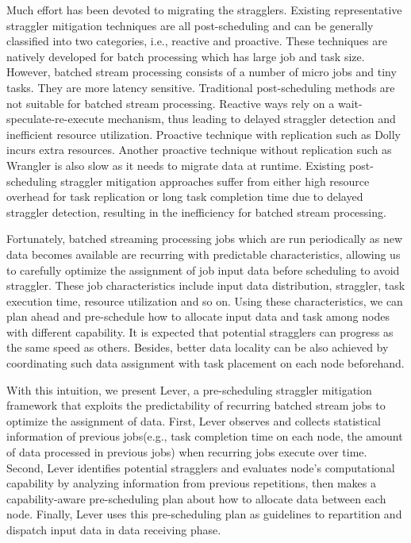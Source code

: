   Much effort has been devoted to migrating the stragglers. Existing representative straggler mitigation techniques are all post-scheduling and can be generally classified into two categories, i.e., reactive and proactive. These techniques are natively developed for batch processing which has large job and task size. However, batched stream processing consists of a number of micro jobs and tiny tasks. They are more latency sensitive. Traditional post-scheduling methods are not suitable for batched stream processing. Reactive ways rely on a wait-speculate-re-execute mechanism, thus leading to delayed straggler detection and inefficient resource utilization. Proactive technique with replication such as Dolly \cite{Ananthanarayanan2013} incurs extra resources. Another proactive technique without replication such as Wrangler \cite{Yadwadkar2014} is also slow as it needs to migrate data at runtime. Existing post-scheduling straggler mitigation approaches suffer from either high resource overhead for task replication or long task completion time due to delayed straggler detection, resulting in the inefficiency for batched stream processing.

  Fortunately, batched streaming processing jobs which are run periodically as new data becomes available \cite{Zaharia2013} are recurring with predictable characteristics, allowing us to carefully optimize the assignment of job input data before scheduling to avoid straggler. These job characteristics include input data distribution, straggler, task execution time, resource utilization and so on. Using these characteristics, we can plan ahead and pre-schedule how to allocate input data and task among nodes with different capability. It is expected that potential stragglers can progress as the same speed as others. Besides, better data locality can be also achieved by coordinating such data assignment with task placement on each node beforehand.

  With this intuition, we present Lever, a pre-scheduling straggler mitigation framework that exploits the predictability of recurring batched stream jobs to optimize the assignment of data. First, Lever observes and collects statistical information of previous jobs(e.g., task completion time on each node, the amount of data processed in previous jobs) when recurring jobs execute over time. Second, Lever identifies potential stragglers and evaluates node's computational capability by analyzing information from previous repetitions, then makes a capability-aware pre-scheduling plan about how to allocate data between each node. Finally, Lever uses this pre-scheduling plan as guidelines to repartition and dispatch input data in data receiving phase.

